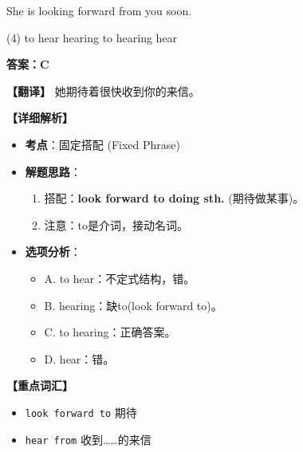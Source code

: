 \documentclass[11pt, a4paper]{article}
\newcommand{\analysis}[4]{
    \begin{solutionbox}
        \textbf{答案：#1}
        
        \textbf{【翻译】} #2
        
        \textbf{【详细解析】}
        #3
        
        \textbf{【重点词汇】}
        #4
    \end{solutionbox}
}
\newcommand{\blank}{\underline{\hspace{1.5cm}}}
\begin{document}
\begin{questions}
    \item She is looking forward \blank from you soon.
    \begin{tasks}(4)
        \task to hear \task hearing \task to hearing \task hear
    \end{tasks}
    \analysis{C}{她期待着很快收到你的来信。}{
        \begin{itemize}
            \item \textbf{考点}：固定搭配 (Fixed Phrase)
            \item \textbf{解题思路}：
                \begin{enumerate}
                    \item 搭配：\textbf{look forward to doing sth.} (期待做某事)。
                    \item 注意：to是介词，接动名词。
                \end{enumerate}
            \item \textbf{选项分析}：
                \begin{itemize}
                    \item A. to hear：不定式结构，错。
                    \item B. hearing：缺to(look forward to)。
                    \item C. to hearing：正确答案。
                    \item D. hear：错。
                \end{itemize}
        \end{itemize}
    }{
        \begin{itemize}
            \item \texttt{look forward to} 期待
            \item \texttt{hear from} 收到……的来信
        \end{itemize}
    }
\end{questions}

\end{document}
